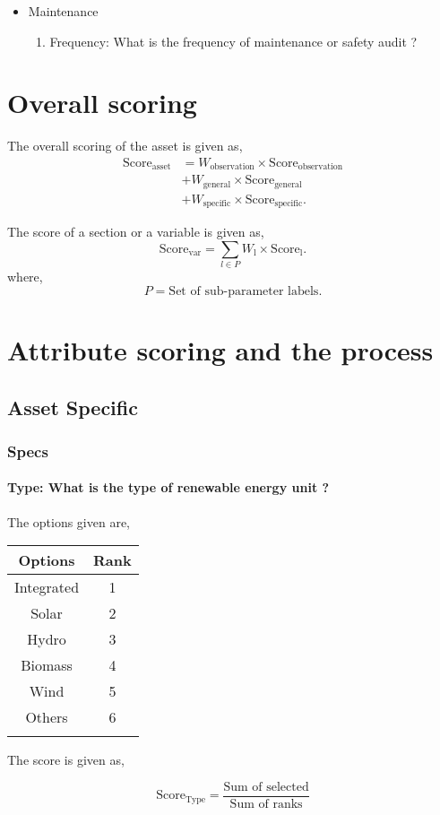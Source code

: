 \documentclass[oneside,twocolumn]{article}
\newcommand{\tsub}[2]{\text{#1}_{\text{#2}}}
\newcommand{\tsubb}[2]{#1_{\text{#2}}}
\newcommand{\dsub}[2]{\dfrac{\text{#1}}{\text{#2}}}
\newcommand{\multsel}[1]
{
	\[
		\tsub{Score}{#1} = \dsub{Sum of selected}{Sum of ranks}
	\]
}
\newenvironment{ttable}
{
\begin{center}
\begin{tabular}{c|c}
\hline
}
{
\\ \hline
\end{tabular}
\end{center}
}
\begin{document}
\begin{itemize}
\begin{itemize}
\item Maintenance
\begin{enumerate}
\item Frequency: What is the frequency of  maintenance or safety audit ?
\end{enumerate}

\end{itemize}

    \end{itemize}
\section{Overall scoring}
The overall scoring of the asset is given as,
\begin{align*}
	\tsub{Score}{asset} &= \tsubb{W}{observation} \times \tsub{Score}{observation} \\
	&+ \tsubb{W}{general} \times \tsub{Score}{general} \\
	&+ \tsubb{W}{specific} \times \tsub{Score}{specific}.
\end{align*}

The score of a section or a variable is given as,
\[
	\tsub{Score}{var} = \sum_{l \in P} \tsubb{W}{l} \times \tsub{Score}{l}.
\]
where,
\[
	P = \text{Set of sub-parameter labels.}
\]
\section{Attribute scoring and the
process}
\subsection{Asset Specific}
\subsubsection{Specs}

\paragraph{Type: What is the type of renewable energy unit ?}

The options given are,
\begin{ttable}
Options & Rank \\ \hline
Integrated & 1 \\
Solar & 2 \\
Hydro & 3 \\
Biomass & 4 \\
Wind & 5 \\
Others & 6 \\
\hline
\end{ttable}
The score is given as,
\multsel{Type}
\end{document}
